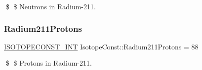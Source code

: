 \$ \$ Neutrons in Radium-\/211. \mbox{\label{group___isotope_const-_radium-_ra211_gac317cc2a4ff94e73c3d11c2a4f6428ab}} 
\subsubsection{\texorpdfstring{Radium211\+Protons}{Radium211Protons}}
{\footnotesize\ttfamily \mbox{\hyperlink{group___isotope_const-_macros_ga5f18360b3e99483a35c32d789e62621c}{I\+S\+O\+T\+O\+P\+E\+C\+O\+N\+S\+T\+\_\+\+I\+NT}} Isotope\+Const\+::\+Radium211\+Protons = 88}

\$ \$ Protons in Radium-\/211. 
